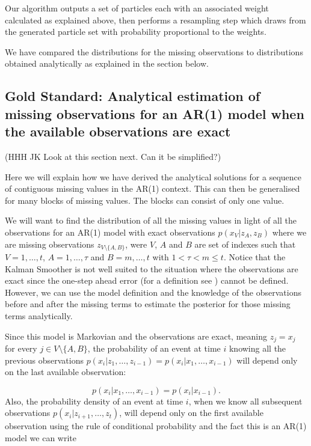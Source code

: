 Our algorithm outputs a set of particles each with an associated weight calculated as explained above, then performs a resampling step which draws from the generated particle set with probability proportional to the weights.

We have compared the distributions for the missing observations to distributions obtained analytically as explained in the section below.

\subsection{Gold Standard: Analytical estimation of missing observations for an AR(1) model when the available observations are exact}
\label{sec:6}

{\color{red} (HHH JK Look at this section next. Can it be simplified?)}

Here we will explain how we have derived the analytical solutions for a sequence of contiguous missing values in the AR(1) context. This can then be generalised for many blocks of missing values. The blocks can consist of only one value.

We will want to find the distribution of all the missing values in light of all the observations for an AR(1) model with exact observations $p(x_V | z_A, z_B)$ where we are missing observations $z_{V \setminus \{A,B\} }$, were $V$, $A$ and $B$ are set of indexes such that $V = 1, \dots, t$, $A = 1, \dots, \tau$ and $B = m, \dots, t$ with $1 < \tau < m \leq t$.
Notice that the Kalman Smoother is not well suited to the situation where the observations are exact since the one-step ahead error {\color{blue}(for a definition see \cite{Young})} cannot be defined. However, we can use the model definition and the knowledge of the observations before and after the missing terms to estimate the posterior for those missing terms analytically.

Since this model is Markovian and the observations are exact, meaning $z_j = x_j$ for every $j \in V \setminus \{A,B\} $, the probability of an event at time $i$ knowing all the previous observations $p(x_i | z_1, \dots, z_{i-1}) = p(x_i | x_1, \dots, x_{i-1})$ will depend only on the last available observation:

\begin{equation*}
    p(x_i | x_1, \dots, x_{i-1}) = p(x_i | x_{i-1}).   
\end{equation*}
Also, the probability density of an event at time $i$, when we know all subsequent observations $p(x_i | z_{i+1}, \dots, z_t)$, will depend only on the first available observation using the rule of conditional probability and the fact this is an AR(1) model we can write

